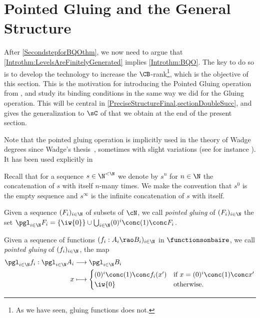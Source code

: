 \chapter{Pointed Gluing and the General Structure}\label{sectionPointedGluing}

After \cref{SecondstepforBQOthm}, we now need to argue that \cref{Introthm:LevelsAreFinitelyGenerated} implies \cref{Introthm:BQO}.
The key to do so is to develop the technology to increase the $\CB$-rank\footnote{As we have seen, gluing functions does not.}, which is the objective of this section.
This is the motivation for introducing the Pointed Gluing operation from \cite{carroy2013quasi}, and study its binding conditions in the same way we did for the Gluing operation.
This will be central in \cref{PreciseStructureFinal,sectionDoubleSucc},
and gives the generalization to $\sC$ of \cite[Theorem 5.2]{carroy2013quasi} that we obtain at the end of the present section.

Note that the pointed gluing operation is implicitly used in the theory of Wadge degrees since Wadge's thesis~\cite{phdwadge}, sometimes with slight variations (see for instance \cite[Section 5]{selivanovnew}).
It has been used explicitly in~\cite[Subsection 2.6]{CMRSWadge}


Recall that for a sequence $s\in\N^{<\N}$ we denote by $s^n$ for $n\in\N$ the concatenation of $s$ with itself $n$-many times.
We make the convention that $s^0$ is the empty sequence and $s^\infty$ is the infinite concatenation of $s$ with itself.


\begin{definition}
Given a sequence $(F_i)_{i\in \N}$ of subsets of $\cN$, 
we call \emph{pointed gluing} of $(F_i)_ {i\in \N}$ the set $\pgl_{i\in\N} F_i =\{\iw{0}\}\cup\bigcup_{i\in \N}(0)^i\conc(1)\conc F_i$.

\medskip

Given a sequence of functions $(f_i:A_i\rao B_i)_{i\in \N}$ in $\functionsonbaire$,
we call \emph{pointed gluing} of $(f_i)_{i\in \N}$, the map
 \begin{align*}
\pgl_{i\in \N}f_i: \pgl_{i\in \N}A_i &\longrightarrow\pgl_{i\in \N}B_i\\
 x &\longmapsto\begin{cases}
(0)^i\conc(1)\conc f_i(x') & \mbox{if }x=(0)^i\conc(1)\conc x'\\
\iw{0} & \mbox{otherwise.}
\end{cases}
\end{align*}
\end{definition}

